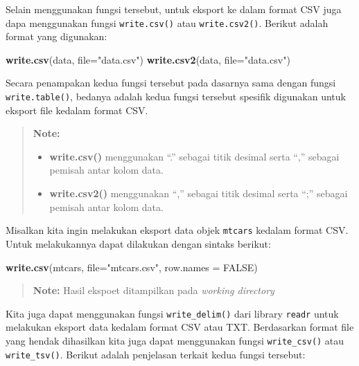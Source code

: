 \documentclass[]{book}
\newenvironment{Shaded}{\begin{snugshade}}{\end{snugshade}}
\newcommand{\KeywordTok}[1]{\textcolor[rgb]{0.13,0.29,0.53}{\textbf{#1}}}
\newcommand{\DataTypeTok}[1]{\textcolor[rgb]{0.13,0.29,0.53}{#1}}
\newcommand{\StringTok}[1]{\textcolor[rgb]{0.31,0.60,0.02}{#1}}
\newcommand{\OtherTok}[1]{\textcolor[rgb]{0.56,0.35,0.01}{#1}}
\newcommand{\NormalTok}[1]{#1}
\providecommand{\tightlist}{%
  \setlength{\itemsep}{0pt}\setlength{\parskip}{0pt}}
\begin{document}
Selain menggunakan fungsi tersebut, untuk eksport ke dalam format CSV
juga dapa menggunakan fungsi \texttt{write.csv()} atau
\texttt{write.csv2()}. Berikut adalah format yang digunakan:

\begin{Shaded}
\begin{Highlighting}[]
\KeywordTok{write.csv}\NormalTok{(data, }\DataTypeTok{file=}\StringTok{"data.csv"}\NormalTok{)}
\KeywordTok{write.csv2}\NormalTok{(data, }\DataTypeTok{file=}\StringTok{"data.csv"}\NormalTok{)}
\end{Highlighting}
\end{Shaded}

Secara penampakan kedua fungsi tersebut pada dasarnya sama dengan fungsi
\texttt{write.table()}, bedanya adalah kedua fungsi tersebut spesifik
digunakan untuk eksport file kedalam format CSV.

\begin{quote}
\textbf{Note: }

\begin{itemize}
\tightlist
\item
  \textbf{write.csv()} menggunakan ``.'' sebagai titik desimal serta
  ``,'' sebagai pemisah antar kolom data.
\item
  \textbf{write.csv2()} menggunakan ``,'' sebagai titik desimal serta
  ``;'' sebagai pemisah antar kolom data.
\end{itemize}
\end{quote}

Misalkan kita ingin melakukan eksport data objek \texttt{mtcars} kedalam
format CSV. Untuk melakukannya dapat dilakukan dengan sintaks berikut:

\begin{Shaded}
\begin{Highlighting}[]
\KeywordTok{write.csv}\NormalTok{(mtcars, }\DataTypeTok{file=}\StringTok{"mtcars.csv"}\NormalTok{, }\DataTypeTok{row.names =} \OtherTok{FALSE}\NormalTok{)}
\end{Highlighting}
\end{Shaded}

\begin{quote}
\textbf{Note: } Hasil ekspoet ditampilkan pada \emph{working directory}
\end{quote}

Kita juga dapat menggunakan fungsi \texttt{write\_delim()} dari library
\texttt{readr} untuk melakukan eksport data kedalam format CSV atau TXT.
Berdasarkan format file yang hendak dihasilkan kita juga dapat
menggunakan fungsi \texttt{write\_csv()} atau \texttt{write\_tsv()}.
Berikut adalah penjelasan terkait kedua fungsi tersebut:
\end{document}
